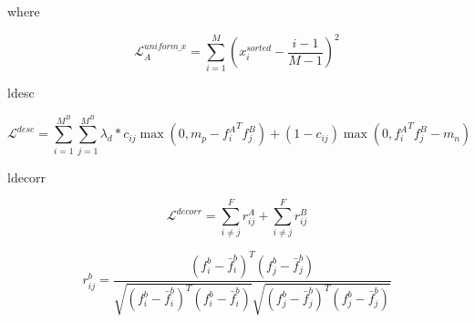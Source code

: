 where

\[
\mathcal{L}^{uniform\_x}_A=\sum_{i=1}^M\left(x_i^{sorted}-\frac{i-1}{M-1}\right)^2
\]

ldesc

\[
\mathcal{L}^{desc}=\sum^{M^B}_{i=1}\sum^{M^B}_{j=1}\lambda_d*c_{ij}\max\left(0,m_p-{f_i^A}^Tf_j^B\right)+(1-c_{ij})\max\left(0,{f_i^A}^Tf_j^B-m_n\right)
\]

ldecorr

\[
\mathcal{L}^{decorr}=\sum^F_{i\neq j}r_{ij}^A+\sum^F_{i\neq j}r_{ij}^B
\]

\[
r^b_{ij}=
\frac{(f_i^b-\bar{f}^b_i)^T(f_j^b-\bar{f}^b_j)}
{
\sqrt{(f_i^b-\bar{f}^b_i)^T(f_i^b-\bar{f}^b_i)}
\sqrt{(f_j^b-\bar{f}^b_j)^T(f_j^b-\bar{f}^b_j)}
}
\]

